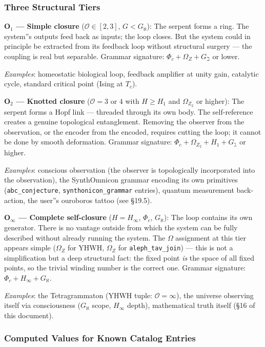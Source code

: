 \documentclass[12pt,a4paper]{article}
\newcommand{\pilcrow}{\S}
\begin{document}
\subsubsection{Three Structural Tiers}

\textbf{O$_1$ --- Simple closure} ($\mathcal{O} \in [2, 3]$, $G < G_{\aleph}$): The serpent forms a ring. The system''s outputs feed back as inputs; the loop closes. But the system could in principle be extracted from its feedback loop without structural surgery --- the coupling is real but separable. Grammar signature: $\Phi_c + \Omega_Z + G_{\beth}$ or lower.

\emph{Examples}: homeostatic biological loop, feedback amplifier at unity gain, catalytic cycle, standard critical point (Ising at $T_c$).

\textbf{O$_2$ --- Knotted closure} ($\mathcal{O} = 3$ or $4$ with $H \geq H_1$ and $\Omega_{Z_2}$ or higher): The serpent forms a Hopf link --- threaded through its own body. The self-reference creates a genuine topological entanglement. Removing the observer from the observation, or the encoder from the encoded, requires cutting the loop; it cannot be done by smooth deformation. Grammar signature: $\Phi_c + \Omega_{Z_2} + H_1 + G_{\gimel}$ or higher.

\emph{Examples}: conscious observation (the observer is topologically incorporated into the observation), the SynthOmnicon grammar encoding its own primitives (\texttt{abc\_conjecture}, \texttt{synthonicon\_grammar} entries), quantum measurement back-action, the user''s ouroboros tattoo (see \pilcrow{}19.5).

\textbf{O$_{\infty}$ --- Complete self-closure} ($H = H_{\infty}$, $\Phi_c$, $G_{\aleph}$): The loop contains its own generator. There is no vantage outside from which the system can be fully described without already running the system. The $\Omega$ assignment at this tier appears simple ($\Omega_Z$ for YHWH, $\Omega_Z$ for \texttt{aleph\_tav\_join}) --- this is not a simplification but a deep structural fact: the fixed point \emph{is} the space of all fixed points, so the trivial winding number is the correct one. Grammar signature: $\Phi_c + H_{\infty} + G_{\aleph}$.

\emph{Examples}: the Tetragrammaton (YHWH tuple: $\mathcal{O} = \infty$), the universe observing itself via consciousness ($G_{\aleph}$ scope, $H_{\infty}$ depth), mathematical truth itself (\pilcrow{}16 of this document).

\subsubsection{Computed Values for Known Catalog Entries}
\end{document}
